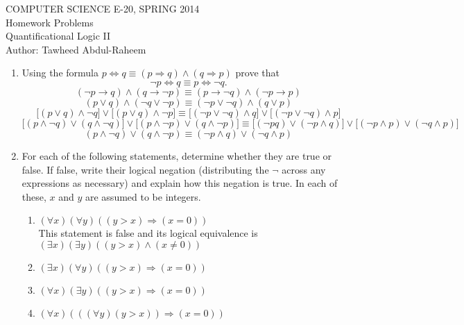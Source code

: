 \documentclass[12pt]{article}
\begin{document}
\begin{center}
COMPUTER SCIENCE E-20, SPRING 2014 \\
Homework Problems\\
Quantificational Logic II\\
Author: Tawheed Abdul-Raheem
\end{center}

\smallskip



\begin{enumerate}
\item Using the formula $p\Leftrightarrow q \equiv (p\Rightarrow q)\land (q\Rightarrow p)$ prove that $$\lnot p \Leftrightarrow q\equiv p\Leftrightarrow \lnot q.$$
        \[( \neg p \rightarrow q) \wedge (q \rightarrow \neg p) \equiv (p \rightarrow \neg q) \wedge (\neg p \rightarrow p) \]
        \[(p \vee q) \wedge (\neg q \vee \neg p) \equiv (\neg p \vee \neg q) \wedge (q \vee p) \]
        \[ \Big[ ( p \vee q) \wedge  \neg q \Big] \vee \Big[ (p \vee q) \wedge \neg p \Big] \equiv \Big[ (\neg p \vee \neg q) \wedge q \Big] \vee \Big[ (\neg p \vee \neg q) \wedge p \Big] \]
        \[ \Big[ ( p \wedge \neg q) \vee (q \wedge \neg q) \Big] \vee \Big[ (p \wedge \neg p) \vee (q \wedge \neg p) \Big] \equiv \Big[ (\neg p q) \vee (\neg p \wedge q) \Big] \vee \Big[ (\neg p \wedge p) \vee (\neg q \wedge p) \Big] \]
        \[(p \wedge \neg q) \vee (q \wedge \neg p) \equiv (\neg p \wedge q) \vee (\neg q \wedge p) \]
\item For each of the following statements, determine whether they are true or false. If false, write their logical negation (distributing the $\lnot$ across any expressions as necessary) and explain how this negation is true. In each of these, $x$ and $y$ are assumed to be integers.
\begin{enumerate}
\item $(\forall x)(\forall y) ((y>x) \Rightarrow (x=0))$ \\
This statement is false and its logical equivalence is $(\exists x )(\exists y)((y > x) \wedge (x \neq 0))$
\item $(\exists x) (\forall y) ((y>x) \Rightarrow (x=0))$ \\
\item $(\forall x)(\exists y) ((y>x) \Rightarrow (x=0))$ \\
\item $(\forall x)(((\forall y)(y>x)) \Rightarrow (x=0))$ \\
\end{enumerate}


\end{enumerate}
\end{document}
